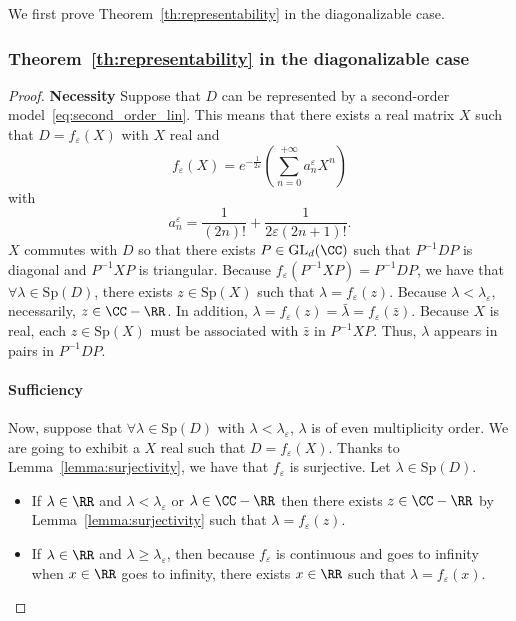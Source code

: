 \documentclass{article}
\begin{document}
We first prove Theorem~\ref{th:representability} in the diagonalizable case. 
\subsubsection{Theorem~\ref{th:representability} in the diagonalizable case}

\begin{proof}


\textbf{Necessity}
Suppose that $D$ can be represented by a second-order model~\eqref{eq:second_order_lin}. This means that there exists a real matrix $X$ such that $D = f_{\varepsilon}(X)$
with $X$ real and
$$f_{\varepsilon}(X)=  e^{-\frac{1}{2\varepsilon}} (\sum_{n=0}^{+\infty} a_n^{\varepsilon} X^n)$$
with 
$$
a_n^{\varepsilon} = \frac{1}{(2n)!} + \frac{1}{2\varepsilon(2n+1)!}.
$$
$X$ commutes with $D$ so that there exists $P \in \mathrm{GL}_d(\CC)$ such that $P^{-1}DP$ is diagonal and $P^{-1}XP$ is triangular. Because $f_{\varepsilon}(P^{-1}XP) = P^{-1}DP$, we have that $\forall \lambda \in \mathrm{Sp}(D)$,  there exists $z \in \mathrm{Sp}(X)$ such that $\lambda = f_{\varepsilon}(z)$. Because $\lambda < \lambda_{\varepsilon}$, necessarily, $z \in \CC - \RR$. In addition, $\lambda = f_{\varepsilon}(z) = \bar{\lambda} = f_{\varepsilon}(\bar{z})$. Because $X$ is real, each $z \in \mathrm{Sp}(X)$ must be associated with $\bar{z}$ in $P^{-1}XP$. Thus, $\lambda$ appears in pairs in $P^{-1}DP$.
\paragraph{Sufficiency}
Now, suppose that $\forall \lambda \in \mathrm{Sp}(D)$ with $\lambda < \lambda_{\varepsilon}$,  $\lambda$ is of even multiplicity order. We are going to exhibit a $X$ real such that $D = f_{\varepsilon}(X)$. Thanks to Lemma~\ref{lemma:surjectivity}, we have that $f_{\varepsilon}$ is surjective. Let $\lambda \in \mathrm{Sp}(D)$.
\begin{itemize}
    \item If $\lambda \in \RR$ and $\lambda < \lambda_{\varepsilon}$ or $\lambda \in \CC - \RR$ then there exists $z \in \CC - \RR$ by Lemma~\ref{lemma:surjectivity} such that $\lambda = f_{\varepsilon}(z)$. 
    \item If $\lambda \in \RR$ and $\lambda \geq \lambda_{\varepsilon}$, then because $f_{\varepsilon}$ is continuous and goes to infinity when $x \in \RR$ goes to infinity, there exists $x \in \RR$ such that $\lambda = f_{\varepsilon}(x)$. 
  

\end{itemize}
\end{proof}
\end{document}
